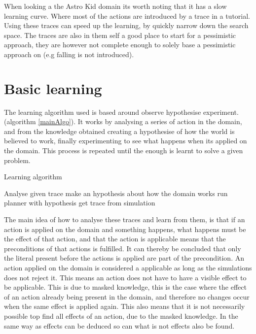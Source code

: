 	

	When looking a the Astro Kid domain its worth noting that it has a slow learning curve. Where most of the actions are introduced by a trace in a tutorial. Using these traces can speed up the learning, by quickly narrow down the search space. The traces are also in them self a good place to start for a pessimistic approach, they are however not complete enough to solely base a pessimistic approach on (e.g falling is not introduced).




\section{Basic learning}
	\label{basic}
	The learning algorithm used is based around observe hypothesise experiment. (algorithm \ref{mainAlgo}). It works by analysing a series of action in the domain, and from the knowledge obtained creating a hypothesise of how the world is believed to work, finally experimenting to see what happens when its applied on the domain. This process is repeated until the enough is learnt to solve a given problem.

	
	\begin{algorithm}
		\caption{Learning algorithm}
		\label{mainAlgo}
		\begin{algorithmic}[1]
			\State Analyse given trace
			\State make an hypothesis about how the domain works
			\State run planner with hypothesis
			\State get trace from simulation
			\EndWhile
			
		\end{algorithmic}
	\end{algorithm}	
	
%	
%	


	The main idea of how to analyse these traces and learn from them, is that if an action is applied on the domain and something happens, what happens must be the effect of that action, and that the action is applicable means that the preconditions of that actions is fulfilled. It can thereby be concluded that only the literal present before the actions is applied are part of the precondition. An action applied on the domain is considered a applicable as long as the simulations does not reject it. This means an action does not have to have a visible effect to be applicable. This is due to masked knowledge, this is the case where the effect of an action already being present in the domain, and therefore no changes occur when the same effect is applied again. This also means that it is not necessarily possible top find all effects of an action, due to the masked knowledge. In the same way as effects can be deduced so can what is not effects also be found.
	
